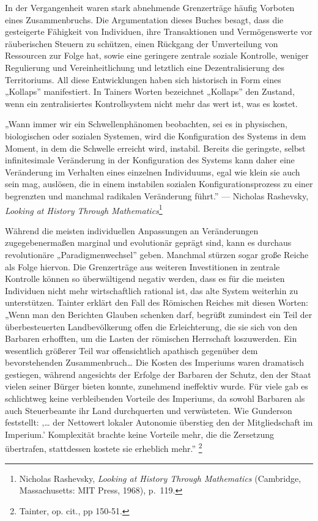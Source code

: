 \documentclass[
  a5paper,
  smalldemyvopaper,10pt,twoside,onecolumn,openright,extrafontsizes,hidelinks]{memoir}
\renewenvironment{quote}%
               {\list{}{\rightmargin=.6cm\leftmargin=.6cm}%
                \itshape \item[]}%
               {\endlist}
\begin{document}
In der Vergangenheit waren stark abnehmende Grenzerträge häufig Vorboten
eines Zusammenbruchs. Die Argumentation dieses Buches besagt, dass die
gesteigerte Fähigkeit von Individuen, ihre Transaktionen und
Vermögenswerte vor räuberischen Steuern zu schützen, einen Rückgang der
Umverteilung von Ressourcen zur Folge hat, sowie eine geringere zentrale
soziale Kontrolle, weniger Regulierung und Vereinheitlichung und
letztlich eine Dezentralisierung des Territoriums. All diese
Entwicklungen haben sich historisch in Form eines „Kollaps''
manifestiert. In Tainers Worten bezeichnet „Kollaps'' den Zustand, wenn
ein zentralisiertes Kontrollsystem nicht mehr das wert ist, was es
kostet.

\begin{quote}
„Wann immer wir ein Schwellenphänomen beobachten, sei es in physischen,
biologischen oder sozialen Systemen, wird die Konfiguration des Systems
in dem Moment, in dem die Schwelle erreicht wird, instabil. Bereits die
geringste, selbst infinitesimale Veränderung in der Konfiguration des
Systems kann daher eine Veränderung im Verhalten eines einzelnen
Individuums, egal wie klein sie auch sein mag, auslösen, die in einem
instabilen sozialen Konfigurationsprozess zu einer begrenzten und
manchmal radikalen Veränderung führt.'' --- Nicholas Rashevsky,
\emph{Looking at History Through Mathematics}\footnote{Nicholas
  Rashevsky, \emph{Looking at History Through Mathematics} (Cambridge,
  Massachusetts: MIT Press, 1968), p.~119.}
\end{quote}

Während die meisten individuellen Anpassungen an Veränderungen
zugegebenermaßen marginal und evolutionär geprägt sind, kann es durchaus
revolutionäre „Paradigmenwechsel'' geben. Manchmal stürzen sogar große
Reiche als Folge hiervon. Die Grenzerträge aus weiteren Investitionen in
zentrale Kontrolle können so überwältigend negativ werden, dass es für
die meisten Individuen nicht mehr wirtschaftlich rational ist, das alte
System weiterhin zu unterstützen. Tainter erklärt den Fall des Römischen
Reiches mit diesen Worten: „Wenn man den Berichten Glauben schenken
darf, begrüßt zumindest ein Teil der überbesteuerten Landbevölkerung
offen die Erleichterung, die sie sich von den Barbaren erhofften, um die
Lasten der römischen Herrschaft loszuwerden. Ein wesentlich größerer
Teil war offensichtlich apathisch gegenüber dem bevorstehenden
Zusammenbruch\ldots{} Die Kosten des Imperiums waren dramatisch
gestiegen, während angesichts der Erfolge der Barbaren der Schutz, den
der Staat vielen seiner Bürger bieten konnte, zunehmend ineffektiv
wurde. Für viele gab es schlichtweg keine verbleibenden Vorteile des
Imperiums, da sowohl Barbaren als auch Steuerbeamte ihr Land
durchquerten und verwüsteten. Wie Gunderson feststellt: ‚\ldots{} der
Nettowert lokaler Autonomie überstieg den der Mitgliedschaft im
Imperium.' Komplexität brachte keine Vorteile mehr, die die Zersetzung
übertrafen, stattdessen kostete sie erheblich mehr.'' \footnote{Tainter,
  op. cit., pp 150-51.}
\end{document}
